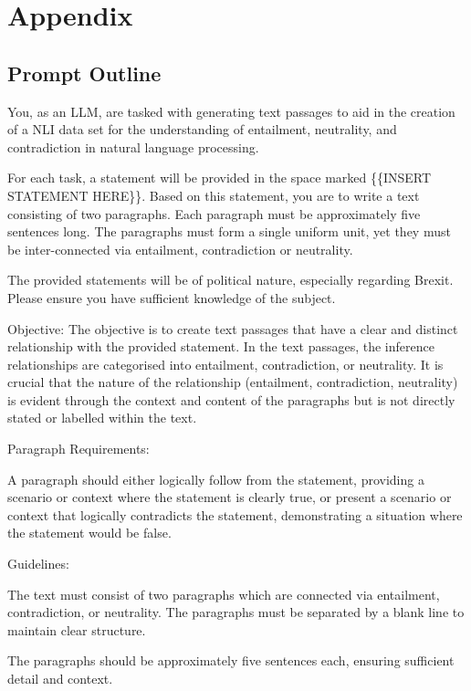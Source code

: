 \documentclass[fleqn,moreauthors,10pt]{ds_report}
\begin{document}
\vspace{\baselineskip}

\section*{Appendix}

\subsection{Prompt Outline}

You, as an LLM, are tasked with generating text passages to aid in the creation of a NLI data set for the understanding of entailment, neutrality, and contradiction in natural language processing.

For each task, a statement will be provided in the space marked \{\{INSERT STATEMENT HERE\}\}. Based on this statement, you are to write a text consisting of two paragraphs. Each paragraph must be approximately five sentences long. The paragraphs must form a single uniform unit, yet they must be inter-connected via entailment, contradiction or neutrality.

The provided statements will be of political nature, especially regarding Brexit. Please ensure you have sufficient knowledge of the subject.

Objective: The objective is to create text passages that have a clear and distinct relationship with the provided statement. In the text passages, the inference relationships are categorised into entailment, contradiction, or neutrality. It is crucial that the nature of the relationship (entailment, contradiction, neutrality) is evident through the context and content of the paragraphs but is not directly stated or labelled within the text.

Paragraph Requirements:

A paragraph should either logically follow from the statement, providing a scenario or context where the statement is clearly true, or present a scenario or context that logically contradicts the statement, demonstrating a situation where the statement would be false.

Guidelines:

The text must consist of two paragraphs which are connected via entailment, contradiction, or neutrality. The paragraphs must be separated by a blank line to maintain clear structure.

The paragraphs should be approximately five sentences each, ensuring sufficient detail and context.
\end{document}
